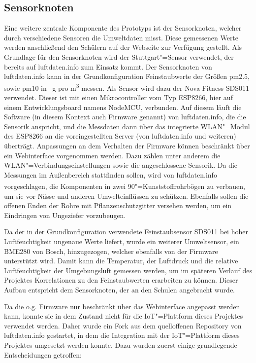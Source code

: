 \subsection{Sensorknoten}

Eine weitere zentrale Komponente des Prototyps ist der Sensorknoten, welcher durch verschiedene Sensoren die Umweltdaten misst.
Diese gemessenen Werte werden anschließend den Schülern auf der Webseite zur Verfügung gestellt. Als Grundlage für den Sensorknoten wird der Stuttgart"=Sensor verwendet, der bereits auf luftdaten.info zum Einsatz kommt.
Der Sensorknoten von luftdaten.info kann in der Grundkonfiguration Feinstaubwerte der Größen pm2.5, sowie pm10 in \si{\mu g} pro \si{{m^3}} messen.
Als Sensor wird dazu der Nova Fitness SDS011 verwendet.
Dieser ist mit einen Mikrocontroller vom Typ ESP8266, hier auf einem Entwicklungsboard namens NodeMCU, verbunden.
Auf diesem läuft die Software (in diesem Kontext auch Firmware genannt) von luftdaten.info, die die Sensorik anspricht, und die Messdaten dann über das integrierte WLAN"=Modul des ESP8266 an die voreingestellten Server (von luftdaten.info und weiteren) überträgt.
Anpassungen an dem Verhalten der Firmware können beschränkt über ein Webinterface vorgenommen werden.
Dazu zählen unter anderem die WLAN"=Verbindungseinstellungen sowie die angeschlossene Sensorik.
Da die Messungen im Außenbereich stattfinden sollen, wird von luftdaten.info vorgeschlagen, die Komponenten in zwei \si{90^{\circ}}"=Kunststoffrohrbögen zu verbauen, um sie vor Nässe und anderen Umwelteinflüssen zu schützen.
Ebenfalls sollen die offenen Enden der Rohre mit Pflanzenschutzgitter versehen werden, um ein Eindringen von Ungeziefer vorzubeugen.

Da der in der Grundkonfiguration verwendete Feinstaubsensor SDS011 bei hoher Luftfeuchtigkeit ungenaue Werte liefert, wurde ein weiterer Umweltsensor, ein BME280 von Bosch, hinzugezogen, welcher ebenfalls von der Firmware unterstützt wird.
Damit kann die Temperatur, der Luftdruck und die relative Luftfeuchtigkeit der Umgebungsluft gemessen werden, um im späteren Verlauf des Projektes Korrelationen zu den Feinstaubwerten erarbeiten zu können.
Dieser Aufbau entspricht dem Sensorknoten, der an den Schulen angebracht wurde.

Da die o.g. Firmware nur beschränkt über das Webinterface angepasst werden kann, konnte sie in dem Zustand nicht für die IoT"=Plattform dieses Projektes verwendet werden.
Daher wurde ein Fork aus dem quelloffenen Repository von luftdaten.info gestartet, in dem die Integration mit der IoT"=Plattform dieses Projektes umgesetzt werden konnte.
Dazu wurden zuerst einige grundlegende Entscheidungen getroffen:

